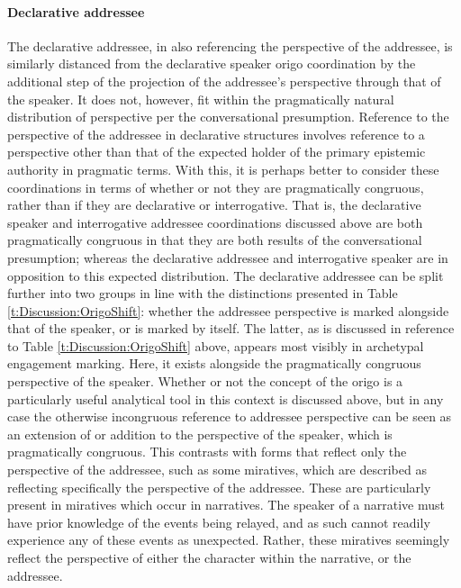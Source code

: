 \paragraph{Declarative addressee}
The declarative addressee, in also referencing the perspective of the addressee, is similarly distanced from the declarative speaker origo coordination by the additional step of the projection of the addressee's perspective through that of the speaker. It does not, however, fit within the pragmatically natural distribution of perspective per the conversational presumption. Reference to the perspective of the addressee in declarative structures involves reference to a perspective other than that of the expected holder of the primary epistemic authority in pragmatic terms. With this, it is perhaps better to consider these coordinations in terms of whether or not they are pragmatically congruous, rather than if they are declarative or interrogative. That is, the declarative speaker and interrogative addressee coordinations discussed above are both pragmatically congruous in that they are both results of the conversational presumption; whereas the declarative addressee and interrogative speaker are in opposition to this expected distribution. The declarative addressee can be split further into two groups in line with the distinctions presented in Table \ref{t:Discussion:OrigoShift}: whether the addressee perspective is marked alongside that of the speaker, or is marked by itself. The latter, as is discussed in reference to Table \ref{t:Discussion:OrigoShift} above, appears most visibly in archetypal engagement marking. Here, it exists alongside the pragmatically congruous perspective of the speaker. Whether or not the concept of the origo is a particularly useful analytical tool in this context is discussed above, but in any case the otherwise incongruous reference to addressee perspective can be seen as an extension of or addition to the perspective of the speaker, which is pragmatically congruous. This contrasts with forms that reflect only the perspective of the addressee, such as some miratives, which are described as reflecting specifically the perspective of the addressee. These are particularly present in miratives which occur in narratives. The speaker of a narrative must have prior knowledge of the events being relayed, and as such cannot readily experience any of these events as unexpected. Rather, these miratives seemingly reflect the perspective of either the character within the narrative, or the addressee. 
